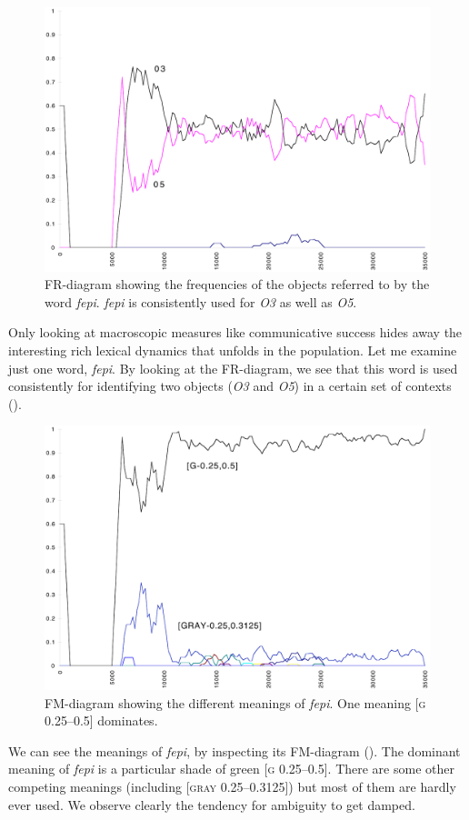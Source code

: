 \begin{figure}[htbp]
  \centerline{\includegraphics[width=.80\textwidth]{chap7/figs/FR-FEPI.pdf}}
\caption{\label{fr-fepi}FR-diagram showing the frequencies
of the objects referred to by the word
\textit{fepi}. \textit{fepi} is consistently used for \emph{O3} as well as
\emph{O5}.}
\end{figure}
Only looking at macroscopic measures like communicative
success hides away the
interesting rich lexical dynamics that unfolds
in the population. Let me examine just one word, \textit{fepi}. 
By looking at the FR-diagram, we see that this word is 
used consistently for identifying two objects
(\emph{O3} and \emph{O5}) in a certain set of contexts
(). 

\begin{figure}[htbp]
  \centerline{\includegraphics[width=.80\textwidth]{chap7/figs/FM-FEPI.pdf}}
\caption{\label{fm-fepi}FM-diagram showing the different
meanings of \textit{fepi}. One meaning [\textsc{g} 0.25–0.5] dominates.}
\end{figure}
We can see the meanings of \textit{fepi}, by 
inspecting its FM-diagram (). 
The dominant meaning of \textit{fepi} is 
a particular shade of green [\textsc{g} 0.25–0.5]. There are 
some other competing meanings (including [\textsc{gray} 0.25–0.3125])
but most of them are hardly ever used. We observe clearly 
the tendency for ambiguity to get damped. 

